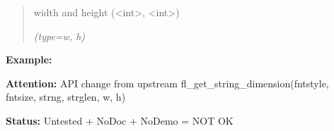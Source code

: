\begin{boxedminipage}{\funcwidth}
      \begin{quote}
      width and height ({\textless}int{\textgreater}, 
      {\textless}int{\textgreater})

      {\it (type=w, h)}

      \end{quote}

\textbf{Example:} 

\textbf{Attention:} API change from upstream fl\_get\_string\_dimension(fntstyle, fntsize, 
strng, strglen, w, h)



\textbf{Status:} Untested + NoDoc + NoDemo = NOT OK



    \end{boxedminipage}

    \label{xformslib:library:fl_get_string_dimension}

    \vspace{0.5ex}

